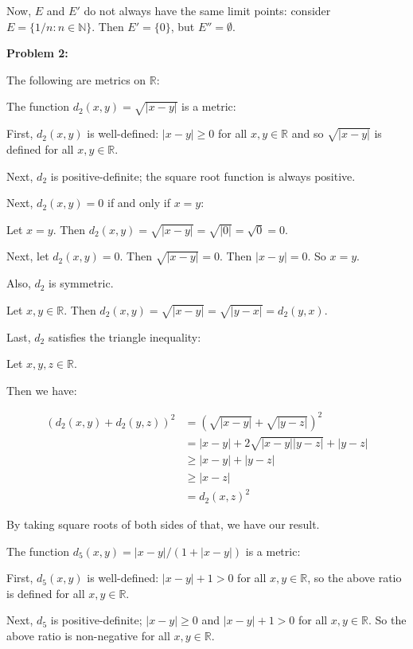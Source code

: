 \documentclass[a4paper,12pt]{article}
\newcommand{\tab}{\hspace{4mm}} %
\newcommand{\shunt}{\vspace{20mm}}
\newcommand{\absval}[1]{\lvert #1 \rvert}
\newcommand{\N}{\mathbb{N}}
\newcommand{\R}{\mathbb{R}}
\begin{document}
Now, $E$ and $E'$ do not always have the same limit points: consider $E = \{1/n: n \in \N\}$. Then $E' = \{0\}$, but $E'' = \emptyset$.

\shunt

{\bf Problem 2:}

The following are metrics on $\R$:

The function $d_2(x,y) = \sqrt{\absval{x-y}}$ is a metric:

\tab First, $d_2(x,y)$ is well-defined: $\absval{x-y} \geq 0$ for all $x, y \in \R$ and so $\sqrt{\absval{x-y}}$ is defined for all $x,y \in \R$.

\tab Next, $d_2$ is positive-definite; the square root function is always positive.

\tab Next, $d_2(x,y) = 0$ if and only if $x=y$: 

\tab \tab Let $x=y$. Then $d_2(x,y) = \sqrt{\absval{x-y}}=\sqrt{\absval{0}}=\sqrt{0}=0$.

\tab \tab Next, let $d_2(x,y) = 0$. Then $\sqrt{\absval{x-y}}=0$. Then $\absval{x-y}=0$. So $x=y$.

\tab Also, $d_2$ is symmetric.

\tab \tab Let $x,y \in \R$. Then $d_2(x,y) = \sqrt{\absval{x-y}} = \sqrt{\absval{y-x}}=d_2(y,x)$.

\tab Last, $d_2$ satisfies the triangle inequality:

\tab \tab Let $x,y,z \in \R$.

\tab \tab Then we have:

\begin{align*}
(d_2(x,y) +d_2(y,z))^2 &= (\sqrt{\absval{x-y}} + \sqrt{\absval{y-z}})^2 \\
&= \absval{x-y} + 2 \sqrt{\absval{x-y}\absval{y-z}} + \absval{y-z}\\
&\geq \absval{x-y} + \absval{y-z}\\
&\geq \absval{x-z}\\
&=d_2(x,z)^2
\end{align*} 

\tab \tab By taking square roots of both sides of that, we have our result.

The function $d_5(x,y) = \absval{x-y}/(1+\absval{x-y})$ is a metric:

\tab First, $d_5(x,y)$ is well-defined: $\absval{x-y} +1 > 0$ for all $x,y \in \R$, so the above ratio is defined for all $x,y \in \R$.

\tab Next, $d_5$ is positive-definite; $\absval{x-y} \geq 0$ and $\absval{x-y} +1 > 0$ for all $x,y \in \R$. So the above ratio is non-negative for all $x,y \in \R$.
\end{document}
